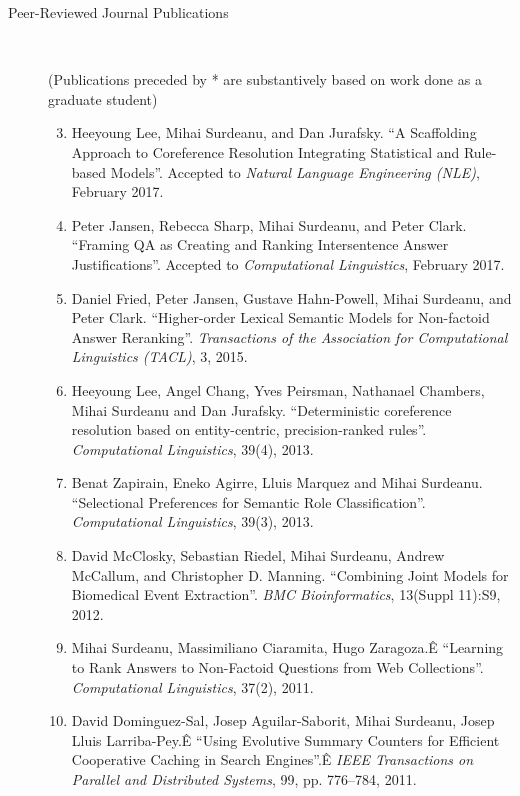 \documentclass[10pt]{article}
\newcommand{\ve}[1]{{\em #1}} %
\newcommand{\ti}[1]{``#1''} %
\begin{document}
\begin{description}
\begin{enumerate}
\end{enumerate}



\item [Peer-Reviewed Journal Publications]\ 

(Publications preceded by * are substantively based on work done as a graduate student)


\begin{enumerate}
\setcounter{enumi}{2}

\item
Heeyoung Lee, Mihai Surdeanu, and Dan Jurafsky.   \ti{A Scaffolding Approach to Coreference Resolution Integrating Statistical and Rule-based Models}. Accepted to \ve{Natural Language Engineering (NLE)}, February 2017.

\item
Peter Jansen, Rebecca Sharp, Mihai Surdeanu, and Peter Clark.  \ti{Framing QA as Creating and Ranking Intersentence Answer Justifications}. Accepted to \ve{Computational Linguistics}, February 2017.

\item
Daniel Fried, Peter Jansen, Gustave Hahn-Powell, Mihai Surdeanu, and Peter Clark.  \ti{Higher-order Lexical Semantic Models for Non-factoid Answer Reranking}. \ve{Transactions of the Association for Computational Linguistics (TACL)}, 3, 2015.

\item
Heeyoung Lee, Angel Chang, Yves Peirsman, Nathanael Chambers, Mihai Surdeanu and Dan Jurafsky.  \ti{Deterministic coreference resolution based on entity-centric, precision-ranked rules}. \ve{Computational Linguistics}, 39(4), 2013.

\item
Benat Zapirain, Eneko Agirre, Lluis Marquez and Mihai Surdeanu.  \ti{Selectional Preferences for Semantic Role Classification}. \ve{Computational Linguistics}, 39(3), 2013.

\item
David McClosky, Sebastian Riedel, Mihai Surdeanu, Andrew McCallum, and Christopher D. Manning.  \ti{Combining Joint Models for Biomedical Event Extraction}. \ve{BMC Bioinformatics}, 13(Suppl 11):S9, 2012.

\item
Mihai Surdeanu, Massimiliano Ciaramita, Hugo Zaragoza.Ê \ti{Learning to Rank Answers to Non-Factoid Questions from Web Collections}. \ve{Computational Linguistics}, 37(2), 2011.

\item
David Dominguez-Sal, Josep Aguilar-Saborit, Mihai Surdeanu, Josep Lluis Larriba-Pey.Ê \ti{Using Evolutive Summary Counters for Efficient Cooperative Caching in Search Engines}.Ê \ve{IEEE Transactions on Parallel and Distributed Systems}, 99, pp. 776--784, 2011.


\end{enumerate}
\end{description}
\end{document}
